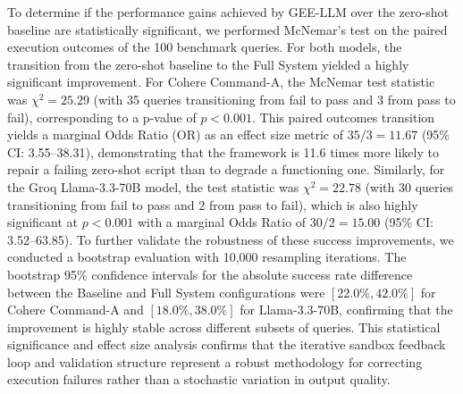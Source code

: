 \documentclass[pdflatex,sn-mathphys-ay]{sn-jnl}
\begin{document}
To determine if the performance gains achieved by GEE-LLM over the zero-shot baseline are statistically significant, we performed McNemar's test on the paired execution outcomes of the 100 benchmark queries. For both models, the transition from the zero-shot baseline to the Full System yielded a highly significant improvement. For Cohere Command-A, the McNemar test statistic was $\chi^2 = 25.29$ (with 35 queries transitioning from fail to pass and 3 from pass to fail), corresponding to a p-value of $p < 0.001$. This paired outcomes transition yields a marginal Odds Ratio (OR) as an effect size metric of $35/3 = 11.67$ (95\% CI: 3.55--38.31), demonstrating that the framework is 11.6 times more likely to repair a failing zero-shot script than to degrade a functioning one. Similarly, for the Groq Llama-3.3-70B model, the test statistic was $\chi^2 = 22.78$ (with 30 queries transitioning from fail to pass and 2 from pass to fail), which is also highly significant at $p < 0.001$ with a marginal Odds Ratio of $30/2 = 15.00$ (95\% CI: 3.52--63.85). To further validate the robustness of these success improvements, we conducted a bootstrap evaluation with 10,000 resampling iterations. The bootstrap 95\% confidence intervals for the absolute success rate difference between the Baseline and Full System configurations were $[22.0\%, 42.0\%]$ for Cohere Command-A and $[18.0\%, 38.0\%]$ for Llama-3.3-70B, confirming that the improvement is highly stable across different subsets of queries. This statistical significance and effect size analysis confirms that the iterative sandbox feedback loop and validation structure represent a robust methodology for correcting execution failures rather than a stochastic variation in output quality.
\end{document}
